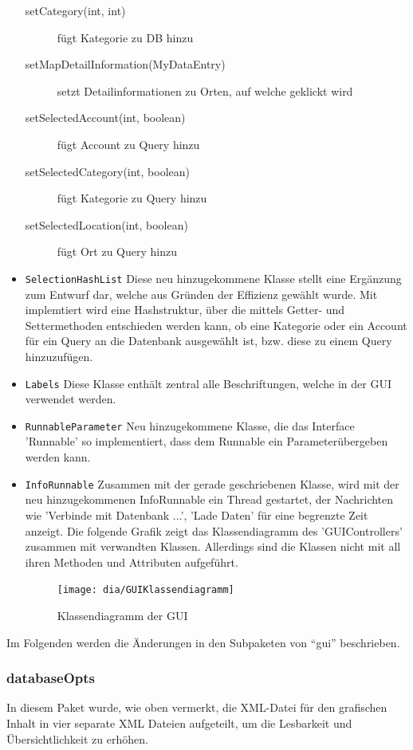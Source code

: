 \begin{itemize}
\begin{description}
		\item[setCategory(int, int)] fügt Kategorie zu DB hinzu
		\item[setMapDetailInformation(MyDataEntry)] setzt Detailinformationen zu Orten, auf welche geklickt wird
		\item[setSelectedAccount(int, boolean)] fügt Account zu Query hinzu
		\item[setSelectedCategory(int, boolean)] fügt Kategorie zu Query hinzu
		\item[setSelectedLocation(int, boolean)] fügt Ort zu Query hinzu
	\end{description}
	\item \lstinline{SelectionHashList}
	\quad
	Diese neu hinzugekommene Klasse stellt  eine Ergänzung zum Entwurf dar, welche aus Gründen der Effizienz gewählt wurde. Mit implemtiert wird eine Hashstruktur, über die mittels Getter- und Settermethoden entschieden werden kann, ob eine Kategorie oder ein Account für ein Query an die Datenbank ausgewählt ist, bzw. diese zu einem Query hinzuzufügen.
	\item \lstinline{Labels}
	\quad
	Diese Klasse enthält zentral alle Beschriftungen, welche in der GUI verwendet werden.
	\item \lstinline{RunnableParameter}
	\quad 
	Neu hinzugekommene Klasse, die das Interface 'Runnable' so implementiert, dass dem Runnable ein Parameterübergeben werden kann.
	\item \lstinline{InfoRunnable}
	\quad
	Zusammen mit der gerade geschriebenen Klasse, wird mit der neu hinzugekommenen InfoRunnable ein Thread gestartet, der Nachrichten wie 'Verbinde mit Datenbank ...', 'Lade Daten' für eine begrenzte Zeit anzeigt.	
	Die folgende Grafik zeigt das Klassendiagramm des 'GUIControllers' zusammen mit verwandten Klassen. Allerdings sind die Klassen nicht mit all ihren Methoden und Attributen aufgeführt.
	\begin{figure}[H]
		\centering
		\texttt{[image: dia/GUIKlassendiagramm]}
		\caption{Klassendiagramm der GUI}
		\label{fig:GUI}
	\end{figure}
\end{itemize}

Im Folgenden werden die Änderungen in den Subpaketen von "`gui"' beschrieben.

\subsubsection{databaseOpts}
In diesem Paket wurde, wie oben vermerkt, die XML-Datei für den grafischen Inhalt in vier separate XML Dateien aufgeteilt, um die Lesbarkeit und Übersichtlichkeit zu erhöhen.


